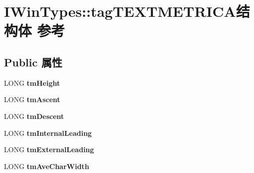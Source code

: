 \hypertarget{struct_i_win_types_1_1tag_t_e_x_t_m_e_t_r_i_c_a}{}\section{I\+Win\+Types\+:\+:tag\+T\+E\+X\+T\+M\+E\+T\+R\+I\+C\+A结构体 参考}
\label{struct_i_win_types_1_1tag_t_e_x_t_m_e_t_r_i_c_a}
\subsection*{Public 属性}
\begin{DoxyCompactItemize}
\item 
\mbox{\label{struct_i_win_types_1_1tag_t_e_x_t_m_e_t_r_i_c_a_a96f138298b0070ad29aade342e993327}} 
L\+O\+NG {\bfseries tm\+Height}
\item 
\mbox{\label{struct_i_win_types_1_1tag_t_e_x_t_m_e_t_r_i_c_a_ab2ca74ff58b7c39a76010f984755cde4}} 
L\+O\+NG {\bfseries tm\+Ascent}
\item 
\mbox{\label{struct_i_win_types_1_1tag_t_e_x_t_m_e_t_r_i_c_a_a287a1e35c202f65c2336f4cb992d8aa1}} 
L\+O\+NG {\bfseries tm\+Descent}
\item 
\mbox{\label{struct_i_win_types_1_1tag_t_e_x_t_m_e_t_r_i_c_a_a7cf09d81376d1ef43394f0ef7719a03f}} 
L\+O\+NG {\bfseries tm\+Internal\+Leading}
\item 
\mbox{\label{struct_i_win_types_1_1tag_t_e_x_t_m_e_t_r_i_c_a_ad93d94d227aee084350cc64aa2f975eb}} 
L\+O\+NG {\bfseries tm\+External\+Leading}
\item 
\mbox{\label{struct_i_win_types_1_1tag_t_e_x_t_m_e_t_r_i_c_a_a527dffd5fdf65f732a7e93e476174c38}} 
L\+O\+NG {\bfseries tm\+Ave\+Char\+Width}
\item 
\mbox{\label{struct_i_win_types_1_1tag_t_e_x_t_m_e_t_r_i_c_a_a4369f5bfdbd896399c6c46abbb7c7041}} 

\end{DoxyCompactItemize}
